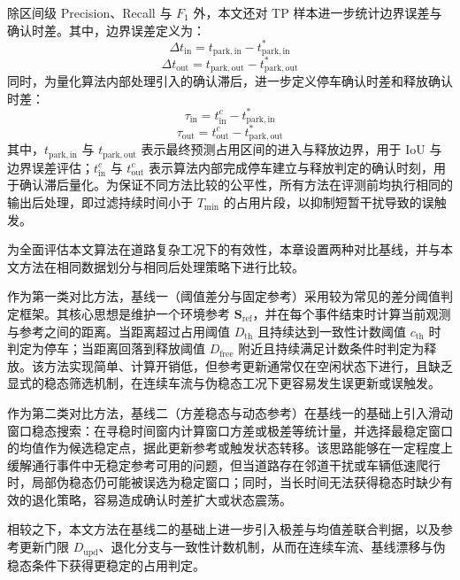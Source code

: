 \documentclass{xdupgthesis}
\begin{document}
除区间级 Precision、Recall 与 $F_1$ 外，本文还对 TP 样本进一步统计边界误差与确认时差。其中，边界误差定义为：
\begin{equation}
    \Delta t_{\mathrm{in}}=t_{\mathrm{park,in}}-t^{*}_{\mathrm{park,in}}
\end{equation}
\begin{equation}
    \Delta t_{\mathrm{out}}=t_{\mathrm{park,out}}-t^{*}_{\mathrm{park,out}}
\end{equation}
同时，为量化算法内部处理引入的确认滞后，进一步定义停车确认时差和释放确认时差：
\begin{equation}
    \tau_{\mathrm{in}}=t^{c}_{\mathrm{in}}-t^{*}_{\mathrm{park,in}}
\end{equation}
\begin{equation}
    \tau_{\mathrm{out}}=t^{c}_{\mathrm{out}}-t^{*}_{\mathrm{park,out}}
\end{equation}
其中，$t_{\mathrm{park,in}}$ 与 $t_{\mathrm{park,out}}$ 表示最终预测占用区间的进入与释放边界，用于 IoU 与边界误差评估；$t^{c}_{\mathrm{in}}$ 与 $t^{c}_{\mathrm{out}}$ 表示算法内部完成停车建立与释放判定的确认时刻，用于确认滞后量化。为保证不同方法比较的公平性，所有方法在评测前均执行相同的输出后处理，即过滤持续时间小于 $T_{\min}$ 的占用片段，以抑制短暂干扰导致的误触发。

为全面评估本文算法在道路复杂工况下的有效性，本章设置两种对比基线，并与本文方法在相同数据划分与相同后处理策略下进行比较。

作为第一类对比方法，基线一（阈值差分与固定参考）采用较为常见的差分阈值判定框架。其核心思想是维护一个环境参考 $\mathbf{S}_{\mathrm{ref}}$，并在每个事件结束时计算当前观测与参考之间的距离。当距离超过占用阈值 $D_{\mathrm{th}}$ 且持续达到一致性计数阈值 $c_{\mathrm{th}}$ 时判定为停车；当距离回落到释放阈值 $D_{\mathrm{free}}$ 附近且持续满足计数条件时判定为释放。该方法实现简单、计算开销低，但参考更新通常仅在空闲状态下进行，且缺乏显式的稳态筛选机制，在连续车流与伪稳态工况下更容易发生误更新或误触发。

作为第二类对比方法，基线二（方差稳态与动态参考）在基线一的基础上引入滑动窗口稳态搜索：在寻稳时间窗内计算窗口方差或极差等统计量，并选择最稳定窗口的均值作为候选稳定点，据此更新参考或触发状态转移。该思路能够在一定程度上缓解通行事件中无稳定参考可用的问题，但当道路存在邻道干扰或车辆低速爬行时，局部伪稳态仍可能被误选为稳定窗口；同时，当长时间无法获得稳态时缺少有效的退化策略，容易造成确认时差扩大或状态震荡。

相较之下，本文方法在基线二的基础上进一步引入极差与均值差联合判据，以及参考更新门限 $D_{\mathrm{upd}}$、退化分支与一致性计数机制，从而在连续车流、基线漂移与伪稳态条件下获得更稳定的占用判定。
\end{document}
